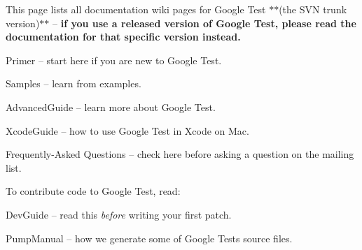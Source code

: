 This page lists all documentation wiki pages for Google Test $\ast$$\ast$(the S\+VN trunk version)$\ast$$\ast$ -- {\bfseries if you use a released version of Google Test, please read the documentation for that specific version instead.}


\begin{DoxyItemize}
\item Primer -- start here if you are new to Google Test.
\item Samples -- learn from examples.
\item Advanced\+Guide -- learn more about Google Test.
\item Xcode\+Guide -- how to use Google Test in Xcode on Mac.
\item Frequently-\/\+Asked Questions -- check here before asking a question on the mailing list.
\end{DoxyItemize}

To contribute code to Google Test, read\+:


\begin{DoxyItemize}
\item Dev\+Guide -- read this {\itshape before} writing your first patch.
\item Pump\+Manual -- how we generate some of Google Test\textquotesingle{}s source files. 
\end{DoxyItemize}